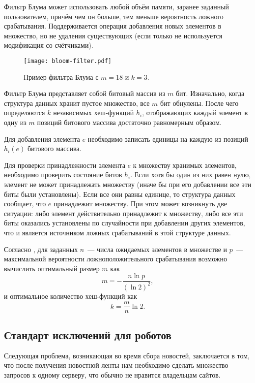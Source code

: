 Фильтр Блума может использовать любой объём памяти, заранее заданный пользователем, причём чем он больше, тем меньше вероятность ложного срабатывания. Поддерживается операция добавления новых элементов в множество, но не удаления существующих (если только не используется модификация со счётчиками).

\begin{figure}[h]
    \centering
    \texttt{[image: bloom-filter.pdf]}
    \caption{Пример фильтра Блума с $m=18$ и $k=3$.}
\end{figure}

Фильтр Блума представляет собой битовый массив из $m$ бит. Изначально, когда структура данных хранит пустое множество, все $m$ бит обнулены. После чего определяются $k$ независимых хеш-функций $h_i$, отображающих каждый элемент в одну из $m$ позиций битового массива достаточно равномерным образом.

Для добавления элемента $e$ необходимо записать единицы на каждую из позиций $h_i(e)$ битового массива.

Для проверки принадлежности элемента $e$ к множеству хранимых элементов, необходимо проверить состояние битов $h_i$. Если хотя бы один из них равен нулю, элемент не может принадлежать множеству (иначе бы при его добавлении все эти биты были установлены). Если все они равны единице, то структура данных сообщает, что $e$ принадлежит множеству. При этом может возникнуть две ситуации: либо элемент действительно принадлежит к множеству, либо все эти биты оказались установлены по случайности при добавлении других элементов, что и является источником ложных срабатываний в этой структуре данных.

Согласно \cite{broder02}, для заданных $n$~--- числа ожидаемых элементов в множестве и $p$~--- максимальной вероятности ложноположительного срабатывания возможно вычислить оптимальный размер $m$ как
\begin{equation}
    m=-\frac{n\ln p}{(\ln 2)^2},
\end{equation}
и оптимальное количество хеш-функций как
\begin{equation}
    k=\frac{m}{n}\ln 2.
\end{equation}

\subsection{Стандарт исключений для роботов} \label{ssec:robotstxt}
Следующая проблема, возникающая во время сбора новостей, заключается в том, что после получения новостной ленты нам необходимо сделать множество запросов к одному серверу, что обычно не нравится владельцам сайтов.

